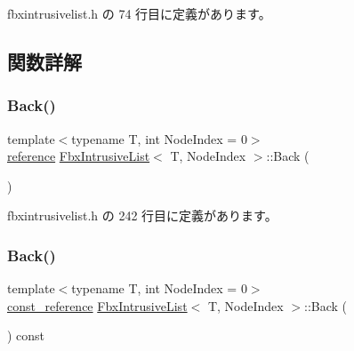  fbxintrusivelist.\+h の 74 行目に定義があります。



\subsection{関数詳解}
\mbox{\label{class_fbx_intrusive_list_a665a77e92b2ff654b2571e1375e7ce25}} 
\subsubsection{\texorpdfstring{Back()}{Back()}\hspace{0.1cm}{\footnotesize\ttfamily [1/2]}}
{\footnotesize\ttfamily template$<$typename T, int Node\+Index = 0$>$ \\
\hyperlink{class_fbx_intrusive_list_aa927f048081371fe74dff673d3a5a8ad}{reference} \hyperlink{class_fbx_intrusive_list}{Fbx\+Intrusive\+List}$<$ T, Node\+Index $>$\+::Back (\begin{DoxyParamCaption}{ }\end{DoxyParamCaption})\hspace{0.3cm}{\ttfamily [inline]}}



 fbxintrusivelist.\+h の 242 行目に定義があります。

\mbox{\label{class_fbx_intrusive_list_a80f48fff8dee5d4a6391409a17292c91}} 
\subsubsection{\texorpdfstring{Back()}{Back()}\hspace{0.1cm}{\footnotesize\ttfamily [2/2]}}
{\footnotesize\ttfamily template$<$typename T, int Node\+Index = 0$>$ \\
\hyperlink{class_fbx_intrusive_list_a21904cb72c0ccae9d5c0b9f171befeb8}{const\+\_\+reference} \hyperlink{class_fbx_intrusive_list}{Fbx\+Intrusive\+List}$<$ T, Node\+Index $>$\+::Back (\begin{DoxyParamCaption}{ }\end{DoxyParamCaption}) const\hspace{0.3cm}{\ttfamily [inline]}}



